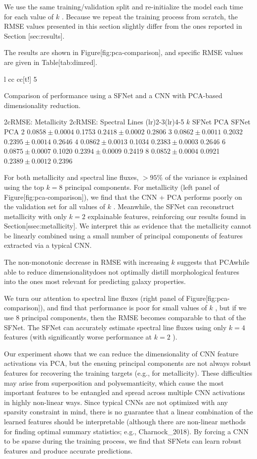 \documentclass[11pt,a4paper]{article}
\begin{document}
We use the same training/validation split and re-initialize the model each time for each value of  $k$ . Because we repeat the training process from scratch, the RMSE values presented in this section slightly differ from the ones reported in Section [sec:results].

The results are shown in Figure[fig:pca-comparison], and specific RMSE values are given in Table[tab:dimred].

l cc cc[t!] 5

Comparison of performance using a SFNet and a CNN with PCA-based dimensionality reduction.

2cRMSE: Metallicity 2cRMSE: Spectral Lines (lr)2-3(lr)4-5  $k$  SFNet PCA SFNet PCA 2   $0.0858 \pm 0.0004$   0.1753   $0.2418 \pm 0.0002$   0.2806 3   $0.0862 \pm 0.0011$   0.2032   $0.2395 \pm 0.0014$   0.2646 4   $0.0862 \pm 0.0013$   0.1034   $0.2383 \pm 0.0003$   0.2646 6   $0.0875 \pm 0.0007$   0.1020   $0.2394 \pm 0.0009$   0.2419 8   $0.0852 \pm 0.0004$   0.0921   $0.2389 \pm 0.0012$   0.2396

For both metallicity and spectral line fluxes,  $>95\%$  of the variance is explained using the top  $k=8$  principal components. For metallicity (left panel of Figure[fig:pca-comparison]), we find that the CNN + PCA performs poorly on the validation set for all values of  $k$ . Meanwhile, the SFNet can reconstruct metallicity with only  $k=2$  explainable features, reinforcing our results found in Section[ssec:metallicity]. We interpret this as evidence that the metallicity cannot be linearly combined using a small number of principal components of features extracted via a typical CNN.

The non-monotonic decrease in RMSE with increasing  $k$  suggests that PCAwhile able to reduce dimensionalitydoes not optimally distill morphological features into the ones most relevant for predicting galaxy properties.

We turn our attention to spectral line fluxes (right panel of Figure[fig:pca-comparison]), and find that performance is poor for small values of  $k$ , but if we use 8 principal components, then the RMSE becomes comparable to that of the SFNet. The SFNet can accurately estimate spectral line fluxes using only  $k=4$  features (with significantly worse performance at  $k=2$ ).

Our experiment shows that we can reduce the dimensionality of CNN feature activations via PCA, but the ensuing principal components are not always robust features for recovering the training targets (e.g., for metallicity). These difficulties may arise from superposition and polysemanticity, which cause the most important features to be entangled and spread across multiple CNN activations in highly non-linear ways. Since typical CNNs are not optimized with any sparsity constraint in mind, there is no guarantee that a linear combination of the learned features should be interpretable (although there are non-linear methods for finding optimal summary statistics; e.g., Charnock\_2018). By forcing a CNN to be sparse during the training process, we find that SFNets can learn robust features and produce accurate predictions.
\end{document}
